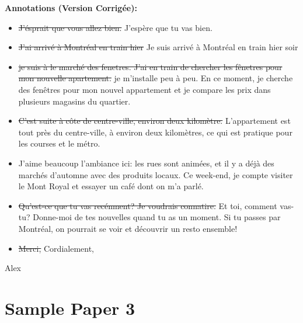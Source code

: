 \documentclass{book}
\begin{document}
\begin{enumerate}
                    \medskip
                    \textbf{Annotations (Version Corrigée):}
                    \begin{itemize}
                        \item \sout{J'ésprait que vous allez bien.} J'espère que tu vas bien.
                        \item \sout{J'ai arrivé à Montréal en train hier} Je suis arrivé à Montréal en train hier soir
                        \item \sout{je suis à le marché des fenetres. J'ai en train de chercher les fênetres pour mon nouvelle apartement.} je m'installe peu à peu. En ce moment, je cherche des fenêtres pour mon nouvel appartement et je compare les prix dans plusieurs magasins du quartier.
                        \item \sout{C'est suite à côte de centre-ville, environ deux kilomètre.} L'appartement est tout près du centre-ville, à environ deux kilomètres, ce qui est pratique pour les courses et le métro.
                        \item J'aime beaucoup l'ambiance ici: les rues sont animées, et il y a déjà des marchés d'automne avec des produits locaux. Ce week-end, je compte visiter le Mont Royal et essayer un café dont on m'a parlé.
                        \item \sout{Qu'est-ce que tu vas recénment? Je voudrais connatire.} Et toi, comment vas-tu? Donne-moi de tes nouvelles quand tu as un moment. Si tu passes par Montréal, on pourrait se voir et découvrir un resto ensemble!
                        \item \sout{Merci,} Cordialement,
                    \end{itemize}
                    Alex
        \end{enumerate}
    \newpage
    \section{Sample Paper 3}
\end{document}

